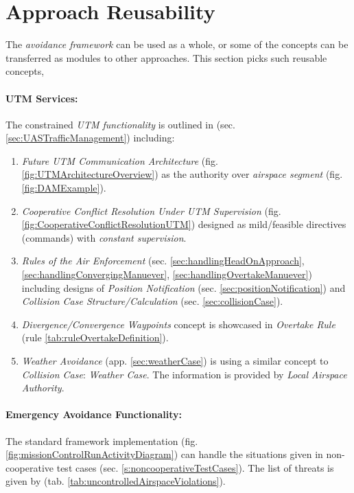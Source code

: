 \section{Approach Reusability}\label{s:approachReusability}
\noindent The  \emph{avoidance framework} can be used as a whole, or some of the concepts can be transferred as modules to other approaches. This section picks such reusable concepts,

\paragraph{UTM Services:} The constrained \emph{UTM functionality} is outlined in (sec. \ref{sec:UASTrafficManagement}) including:
\begin{enumerate}
    \item \emph{Future UTM Communication Architecture} (fig. \ref{fig:UTMArchitectureOverview}) as the authority over \emph{airspace segment} (fig. \ref{fig:DAMExample})\cite{gerdes2016dynamic}.
    
    \item \emph{Cooperative Conflict Resolution Under UTM Supervision} (fig. \ref{fig:CooperativeConflictResolutionUTM}) designed as mild/feasible directives (commands) with \emph{constant supervision}.
    
    \item \emph{Rules of the Air Enforcement} (sec. \ref{sec:handlingHeadOnApproach}, \ref{sec:handlingConvergingManuever}, \ref{sec:handlingOvertakeManuever}) including designs of \emph{Position Notification} (sec. \ref{sec:positionNotification}) and \emph{Collision Case Structure/Calculation} (sec. \ref{sec:collisionCase}).
    
    \item \emph{Divergence/Convergence Waypoints} concept is showcased in \emph{Overtake Rule} (rule \ref{tab:ruleOvertakeDefinition}). 
    
    \item \emph{Weather Avoidance} (app. \ref{sec:weatherCase}) is using a similar concept to \emph{Collision Case}: \emph{Weather Case}. The information is provided by \emph{Local Airspace Authority}.
    
\end{enumerate}

\paragraph{Emergency Avoidance Functionality:}  The standard framework implementation (fig. \ref{fig:missionControlRunActivityDiagram}) can handle the situations given in non-cooperative test cases (sec. \ref{s:noncooperativeTestCases}). The list of threats is given by (tab. \ref{tab:uncontrolledAirspaceViolations}). 

